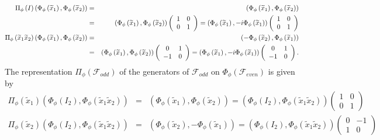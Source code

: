 \documentclass[aps,preprint]{revtex4}
\begin{document}
\begin{eqnarray}
\Pi _{\phi }\left( I\right) \left( \Phi _{\phi }\left( \widetilde{x}%
_{1}\right) ,\Phi _{\phi }\left( \widetilde{x}_{2}\right) \right) &=&\left(
\Phi _{\phi }\left( \widetilde{x}_{1}\right) ,\Phi _{\phi }\left( \widetilde{%
x}_{2}\right) \right) \\
&=&\left( \Phi _{\phi }\left( \widetilde{x}_{1}\right) ,\Phi _{\phi }\left( 
\widetilde{x}_{2}\right) \right) \left( 
\begin{array}{cc}
1 & 0 \\ 
0 & 1%
\end{array}%
\right) =\left( \Phi _{\phi }\left( \widetilde{x}_{1}\right) ,-i\Phi _{\phi
}\left( \widetilde{x}_{1}\right) \right) \left( 
\begin{array}{cc}
1 & 0 \\ 
0 & 1%
\end{array}%
\right) \\
\Pi _{\phi }\left( \widetilde{x}_{1}\widetilde{x}_{2}\right) \left( \Phi
_{\phi }\left( \widetilde{x}_{1}\right) ,\Phi _{\phi }\left( \widetilde{x}%
_{2}\right) \right) &=&\left( -\Phi _{\phi }\left( \widetilde{x}_{2}\right)
,\Phi _{\phi }\left( \widetilde{x}_{1}\right) \right) \\
&=&\left( \Phi _{\phi }\left( \widetilde{x}_{1}\right) ,\Phi _{\phi }\left( 
\widetilde{x}_{2}\right) \right) \left( 
\begin{array}{cc}
0 & 1 \\ 
-1 & 0%
\end{array}%
\right) =\left( \Phi _{\phi }\left( \widetilde{x}_{1}\right) ,-i\Phi _{\phi
}\left( \widetilde{x}_{1}\right) \right) \left( 
\begin{array}{cc}
0 & 1 \\ 
-1 & 0%
\end{array}%
\right) .
\end{eqnarray}%
The representation $\Pi _{\phi }\left( \mathcal{F}_{odd}\right) $ of the
generators of $\mathcal{F}_{odd}$ on $\Phi _{\phi }\left( \mathcal{F}%
_{even}\right) $ is given by 
\begin{eqnarray}
\Pi _{\phi }\left( \widetilde{x}_{1}\right) \left( \Phi _{\phi }\left(
I_{2}\right) ,\Phi _{\phi }\left( \widetilde{x}_{1}\widetilde{x}_{2}\right)
\right) &=&\left( \Phi _{\phi }\left( \widetilde{x}_{1}\right) ,\Phi _{\phi
}\left( \widetilde{x}_{2}\right) \right) =\left( \Phi _{\phi }\left(
I_{2}\right) ,\Phi _{\phi }\left( \widetilde{x}_{1}\widetilde{x}_{2}\right)
\right) \left( 
\begin{array}{cc}
1 & 0 \\ 
0 & 1%
\end{array}%
\right) \\
\Pi _{\phi }\left( \widetilde{x}_{2}\right) \left( \Phi _{\phi }\left(
I_{2}\right) ,\Phi _{\phi }\left( \widetilde{x}_{1}\widetilde{x}_{2}\right)
\right) &=&\left( \Phi _{\phi }\left( \widetilde{x}_{2}\right) ,-\Phi _{\phi
}\left( \widetilde{x}_{1}\right) \right) =\left( \Phi _{\phi }\left(
I_{2}\right) ,\Phi _{\phi }\left( \widetilde{x}_{1}\widetilde{x}_{2}\right)
\right) \left( 
\begin{array}{cc}
0 & -1 \\ 
1 & 0%
\end{array}%
\right)
\end{eqnarray}%
\end{document}
